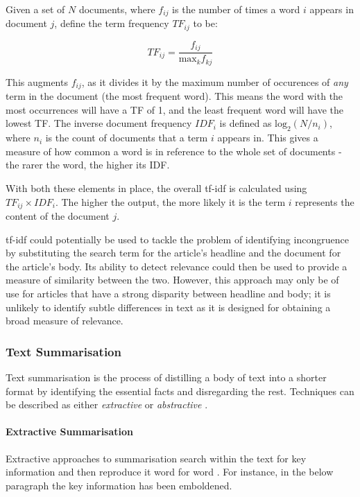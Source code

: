 Given a set of \(N\) documents, where \(f_{ij}\) is the number of times a word \(i\) appears in document \(j\), \citeauthor{Rajaraman2011} define the term frequency \(TF_{ij}\) to be:

\[TF_{ij} = \frac{f_{ij}}{\textrm{max}_k f_{kj}}\]

This augments \(f_{ij}\), as it divides it by the maximum number of occurences of \textit{any} term in the document (the most frequent word). This means the word with the most occurrences will have a TF of 1, and the least frequent word will have the lowest TF. The inverse document frequency \(IDF_i\) is defined as \(\textrm{log}_2(N/n_i)\), where \(n_i\) is the count of documents that a term \(i\) appears in. This gives a measure of how common a word is in reference to the whole set of documents - the rarer the word, the higher its IDF.

With both these elements in place, the overall tf-idf is calculated using \(TF_{ij} \times IDF_i\). The higher the output, the more likely it is the term \(i\) represents the content of the document \(j\).

tf-idf could potentially be used to tackle the problem of identifying incongruence by substituting the search term for the article's headline and the document for the article's body. Its ability to detect relevance could then be used to provide a measure of similarity between the two. However, this approach may only be of use for articles that have a strong disparity between headline and body; it is unlikely to identify subtle differences in text as it is designed for obtaining a broad measure of relevance.


\subsubsection{Text Summarisation}

Text summarisation is the process of distilling a body of text into a shorter format by identifying the essential facts and disregarding the rest. Techniques can be described as either \textit{extractive} or \textit{abstractive}  \cite{maybury1999} \cite{tan2017}.

\paragraph{Extractive Summarisation}
Extractive approaches to summarisation search within the text for key information and then reproduce it word for word \cite{tan2017}. For instance, in the below paragraph the key information has been emboldened.

